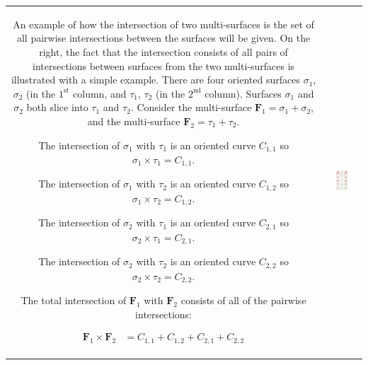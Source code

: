 \begin{center}
\begin{tabular}{cc}
\parbox{0.5\textwidth}{
An example of how the intersection of two multi-surfaces is the set of all pairwise intersections between the surfaces will be given. On the right, the fact that the intersection consists of all pairs of intersections between surfaces from the two multi-surfaces is illustrated with a simple example. There are four oriented surfaces \(\sigma_1\), \(\sigma_2\) (in the \(1^\text{st}\) column, and \(\tau_1\), \(\tau_2\) (in the \(2^\text{nd}\) column). Surfaces \(\sigma_1\) and \(\sigma_2\) both slice into \(\tau_1\) and \(\tau_2\). Consider the multi-surface \(\mathbf{F}_1 = \sigma_1 + \sigma_2\), and the multi-surface \(\mathbf{F}_2 = \tau_1 + \tau_2\). 

The intersection of \(\sigma_1\) with \(\tau_1\) is an oriented curve \(C_{1,1}\) so \(\sigma_1 \times \tau_1 = C_{1,1}\).  

The intersection of \(\sigma_1\) with \(\tau_2\) is an oriented curve \(C_{1,2}\) so \(\sigma_1 \times \tau_2 = C_{1,2}\).  

The intersection of \(\sigma_2\) with \(\tau_1\) is an oriented curve \(C_{2,1}\) so \(\sigma_2 \times \tau_1 = C_{2,1}\).   

The intersection of \(\sigma_2\) with \(\tau_2\) is an oriented curve \(C_{2,2}\) so \(\sigma_2 \times \tau_2 = C_{2,2}\).     

The total intersection of \(\mathbf{F}_1\) with \(\mathbf{F}_2\) consists of all of the pairwise intersections:

\begin{align*}
\mathbf{F}_1 \times \mathbf{F}_2 & = C_{1,1} + C_{1,2} + C_{2,1} + C_{2,2} 
\end{align*}
} & \parbox{0.4\textwidth}{
\includegraphics[width = 0.4\textwidth]{Intersections/Surface-surface_intersections/surface_surface_intersection_distributive_law}
}
\end{tabular}
\end{center}

